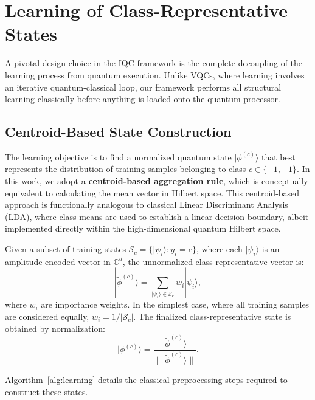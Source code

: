 \documentclass[conference]{IEEEtran}
\begin{document}
\section{Learning of Class-Representative States}
\label{sec:centroids}

A pivotal design choice in the IQC framework is the complete decoupling of the learning process from quantum execution. Unlike VQCs, where learning involves an iterative quantum-classical loop, our framework performs all structural learning classically before anything is loaded onto the quantum processor.

\subsection{Centroid-Based State Construction}

The learning objective is to find a normalized quantum state $|\phi^{(c)}\rangle$ that best represents the distribution of training samples belonging to class $c \in \{-1, +1\}$. In this work, we adopt a \textbf{centroid-based aggregation rule}, which is conceptually equivalent to calculating the mean vector in Hilbert space. This centroid-based approach is functionally analogous to classical Linear Discriminant Analysis (LDA), where class means are used to establish a linear decision boundary, albeit implemented directly within the high-dimensional quantum Hilbert space.

Given a subset of training states $\mathcal{S}_c = \{|\psi_i\rangle : y_i = c\}$, where each $|\psi_i\rangle$ is an amplitude-encoded vector in $\mathbb{C}^d$, the unnormalized class-representative vector is:
\begin{equation}
| \tilde{\phi}^{(c)} \rangle = \sum_{|\psi_i\rangle \in \mathcal{S}_c} w_i |\psi_i\rangle,
\end{equation}
where $w_i$ are importance weights. In the simplest case, where all training samples are considered equally, $w_i = 1/|\mathcal{S}_c|$. The finalized class-representative state is obtained by normalization:
\begin{equation}
|\phi^{(c)}\rangle = \frac{| \tilde{\phi}^{(c)} \rangle}{\| | \tilde{\phi}^{(c)} \rangle \|}.
\end{equation}

Algorithm~\ref{alg:learning} details the classical preprocessing steps required to construct these states.
\end{document}
